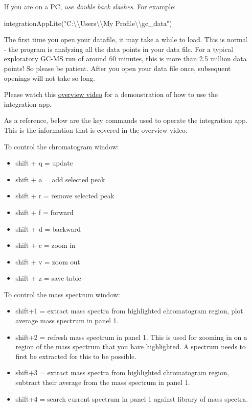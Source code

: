 \documentclass[
]{krantz}
\newenvironment{Shaded}{\begin{snugshade}}{\end{snugshade}}
\newcommand{\FunctionTok}[1]{\textcolor[rgb]{0.00,0.00,0.00}{#1}}
\newcommand{\NormalTok}[1]{#1}
\newcommand{\SpecialCharTok}[1]{\textcolor[rgb]{0.00,0.00,0.00}{#1}}
\newcommand{\StringTok}[1]{\textcolor[rgb]{0.31,0.60,0.02}{#1}}
\providecommand{\tightlist}{%
  \setlength{\itemsep}{0pt}\setlength{\parskip}{0pt}}
\begin{document}
If you are on a PC, \emph{use double back slashes}. For example:

\begin{Shaded}
\begin{Highlighting}[]
\FunctionTok{integrationAppLite}\NormalTok{(}\StringTok{"C:}\SpecialCharTok{\textbackslash{}\textbackslash{}}\StringTok{Users}\SpecialCharTok{\textbackslash{}\textbackslash{}}\StringTok{My Profile}\SpecialCharTok{\textbackslash{}\textbackslash{}}\StringTok{gc\_data"}\NormalTok{)}
\end{Highlighting}
\end{Shaded}

\hfill\break

The first time you open your datafile, it may take a while to load. This is normal - the program is analyzing all the data points in your data file. For a typical exploratory GC-MS run of around 60 minutes, this is more than 2.5 million data points! So please be patient. After you open your data file once, subsequent openings will not take so long.

Please watch this \href{https://drive.google.com/file/d/1Jv-EEwaLIxpQJSVZGD1NFkfZGOUaayKo/view?usp=sharing}{overview video} for a demonstration of how to use the integration app.

As a reference, below are the key commands used to operate the integration app. This is the information that is covered in the overview video.

To control the chromatogram window:

\begin{itemize}
\tightlist
\item
  shift + q = update
\item
  shift + a = add selected peak
\item
  shift + r = remove selected peak
\item
  shift + f = forward
\item
  shift + d = backward
\item
  shift + c = zoom in
\item
  shift + v = zoom out
\item
  shift + z = save table
\end{itemize}

To control the mass spectrum window:

\begin{itemize}
\tightlist
\item
  shift+1 = extract mass spectra from highlighted chromatogram region, plot average mass spectrum in panel 1.
\item
  shift+2 = refresh mass spectrum in panel 1. This is used for zooming in on a region of the mass spectrum that you have highlighted. A spectrum needs to first be extracted for this to be possible.
\item
  shift+3 = extract mass spectra from highlighted chromatogram region, subtract their average from the mass spectrum in panel 1.
\item
  shift+4 = search current spectrum in panel 1 against library of mass spectra.
\end{itemize}
\end{document}
